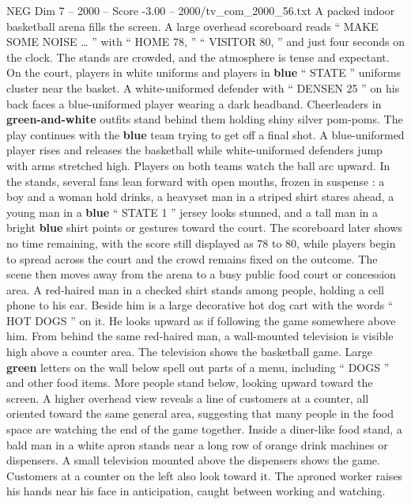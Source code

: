 \begin{textsample}{NEG Dim 7 – 2000 – Score -3.00 – 2000/tv\_com\_2000\_56.txt}  \label{ex:f7_neg_029}
A packed indoor basketball arena fills the screen.
A large overhead scoreboard reads “ MAKE SOME NOISE … ” with “ HOME 78, ” “ VISITOR 80, ” and just four seconds on the clock.
The stands are crowded, and the atmosphere is tense and expectant.
On the court, players in white uniforms and players in \textbf{blue} “ STATE ” uniforms cluster near the basket.
A white-uniformed defender with “ DENSEN 25 ” on his back faces a blue-uniformed player wearing a dark headband.
Cheerleaders in \textbf{green-and-white} outfits stand behind them holding shiny silver pom-poms.
The play continues with the \textbf{blue} team trying to get off a final shot.
A blue-uniformed player rises and releases the basketball while white-uniformed defenders jump with arms stretched high.
Players on both teams watch the ball arc upward.
In the stands, several fans lean forward with open mouths, frozen in suspense : a boy and a woman hold drinks, a heavyset man in a striped shirt stares ahead, a young man in a \textbf{blue} “ STATE 1 ” jersey looks stunned, and a tall man in a bright \textbf{blue} shirt points or gestures toward the court.
The scoreboard later shows no time remaining, with the score still displayed as 78 to 80, while players begin to spread across the court and the crowd remains fixed on the outcome.
The scene then moves away from the arena to a busy public food court or concession area.
A red-haired man in a checked shirt stands among people, holding a cell phone to his ear.
Beside him is a large decorative hot dog cart with the words “ HOT DOGS ” on it.
He looks upward as if following the game somewhere above him.
From behind the same red-haired man, a wall-mounted television is visible high above a counter area.
The television shows the basketball game.
Large \textbf{green} letters on the wall below spell out parts of a menu, including “ DOGS ” and other food items.
More people stand below, looking upward toward the screen.
A higher overhead view reveals a line of customers at a counter, all oriented toward the same general area, suggesting that many people in the food space are watching the end of the game together.
Inside a diner-like food stand, a bald man in a white apron stands near a long row of orange drink machines or dispensers.
A small television mounted above the dispensers shows the game.
Customers at a counter on the left also look toward it.
The aproned worker raises his hands near his face in anticipation, caught between working and watching.

\end{textsample}

